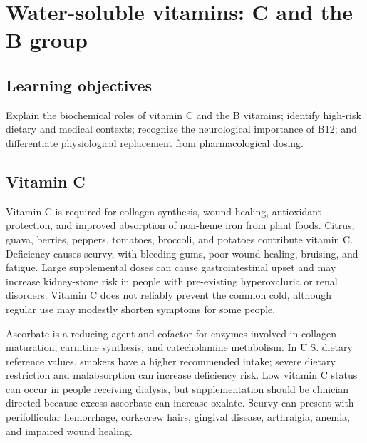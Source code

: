 \chapter{Water-soluble vitamins: C and the B group}

\section{Learning objectives}
Explain the biochemical roles of vitamin C and the B vitamins; identify high-risk dietary and medical contexts; recognize the neurological importance of B12; and differentiate physiological replacement from pharmacological dosing.

\section{Vitamin C}
Vitamin C is required for collagen synthesis, wound healing, antioxidant protection, and improved absorption of non-heme iron from plant foods. Citrus, guava, berries, peppers, tomatoes, broccoli, and potatoes contribute vitamin C. Deficiency causes scurvy, with bleeding gums, poor wound healing, bruising, and fatigue. Large supplemental doses can cause gastrointestinal upset and may increase kidney-stone risk in people with pre-existing hyperoxaluria or renal disorders. Vitamin C does not reliably prevent the common cold, although regular use may modestly shorten symptoms for some people. \cite{odsC}

Ascorbate is a reducing agent and cofactor for enzymes involved in collagen maturation, carnitine synthesis, and catecholamine metabolism. In U.S. dietary reference values, smokers have a higher recommended intake; severe dietary restriction and malabsorption can increase deficiency risk. Low vitamin C status can occur in people receiving dialysis, but supplementation should be clinician directed because excess ascorbate can increase oxalate. Scurvy can present with perifollicular hemorrhage, corkscrew hairs, gingival disease, arthralgia, anemia, and impaired wound healing. \cite{odsC}

